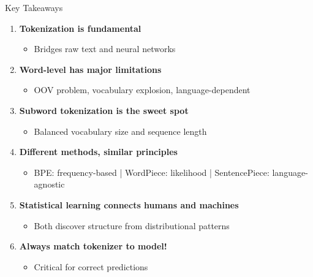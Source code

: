 \documentclass[aspectratio=169]{beamer}
\begin{document}
\begin{frame}[shrink=10]{Key Takeaways 🎯}
    \begin{enumerate}\setlength{\itemsep}{0pt}
        \item \textbf{Tokenization is fundamental}
        \begin{itemize}\setlength{\itemsep}{0pt}
            \item Bridges raw text and neural networks
        \end{itemize}

        \item \textbf{Word-level has major limitations}
        \begin{itemize}\setlength{\itemsep}{0pt}
            \item OOV problem, vocabulary explosion, language-dependent
        \end{itemize}

        \item \textbf{Subword tokenization is the sweet spot}
        \begin{itemize}\setlength{\itemsep}{0pt}
            \item Balanced vocabulary size and sequence length
        \end{itemize}

        \item \textbf{Different methods, similar principles}
        \begin{itemize}\setlength{\itemsep}{0pt}
            \item BPE: frequency-based | WordPiece: likelihood | SentencePiece: language-agnostic
        \end{itemize}

        \item \textbf{Statistical learning connects humans and machines}
        \begin{itemize}\setlength{\itemsep}{0pt}
            \item Both discover structure from distributional patterns
        \end{itemize}

        \item \textbf{Always match tokenizer to model!}
        \begin{itemize}\setlength{\itemsep}{0pt}
            \item Critical for correct predictions
        \end{itemize}
    \end{enumerate}
\end{frame}
\end{document}
